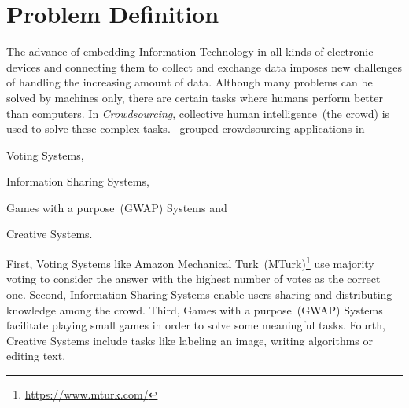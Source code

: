 \documentclass[oneside,article,a4paper,11pt]{memoir}
\begin{document}
\setlength{\parindent}{\thisparindent}%
\setlength{\baselineskip}{\thisbaselineskip}%
\setlength{\parskip}{\thisparskip}%
\restoregeometry




\setcounter{page}{1}
\pagestyle{plain}

\section{Problem Definition}
The advance of embedding Information Technology in all kinds of electronic devices and connecting them to collect and exchange data imposes new challenges of handling the increasing amount of data. Although many problems can be solved by machines only, there are certain tasks where humans perform better than computers. In \emph{Crowdsourcing}, collective human intelligence~(the crowd) is used to solve these complex tasks. \citet{yuen2011survey}~grouped crowdsourcing applications in 
\begin{inparaenum}[1)]
		\item Voting Systems,
		\item Information Sharing Systems,
		\item Games with a purpose~(GWAP) Systems and
		\item Creative Systems.
\end{inparaenum} 
First, Voting Systems like Amazon Mechanical Turk~(MTurk)\footnote{\url{https://www.mturk.com/}} use majority voting to consider the answer with the highest number of votes as the correct one. Second, Information Sharing Systems enable users sharing and distributing knowledge among the crowd. Third, Games with a purpose~(GWAP) Systems facilitate playing small games in order to solve some meaningful tasks. Fourth, Creative Systems include tasks like labeling an image, writing algorithms or editing text. 
\end{document}
